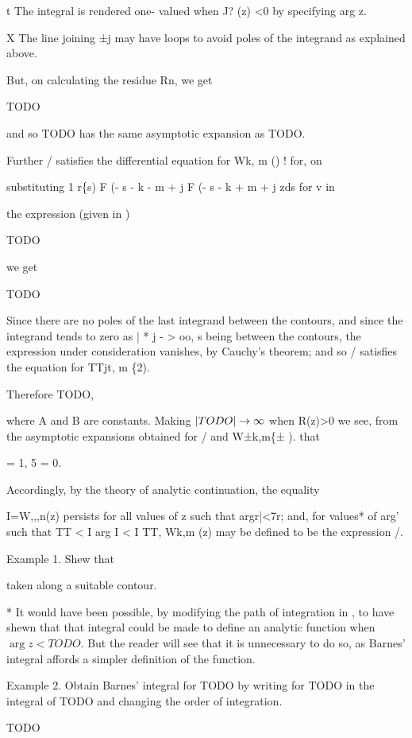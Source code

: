 t The integral is rendered one- valued when J? (z) <0 by specifying
arg z.

X The line joining ±j may have loops to avoid poles of the integrand
as explained above.

%
%
But, on calculating the residue Rn, we get

TODO

and so TODO has the same asymptotic expansion as TODO.

Further / satisfies the differential equation for Wk, m () ! for, on

substituting 1 r\{s) F (- s - k - m + j F (- s - k + m + j zds
for v in

the expression (given in )

TODO

we get

TODO

Since there are no poles of the last integrand between the contours,
and since the integrand tends to zero as | * j - > oo, s being
between the contours, the expression under consideration vanishes, by
Cauchy's theorem; and so / satisfies the equation for TTjt, m \{2).

Therefore TODO,

where A and B are constants. Making $\left| TODO \right| \rightarrow \infty$
when R(z)>0 we see, from the asymptotic expansions obtained for / and
W±k,m\{± ). that

 = 1, 5 = 0.

Accordingly, by the theory of analytic continuation, the equality

I=W,,,n(z) persists for all values of z such that argr|<7r; and, for
values* of arg' such that TT < I arg  I < I TT, Wk,m (z) may be
defined to be the expression /.

Example 1. Shew that

taken along a suitable contour.

* It would have been possible, by modifying the path of integration in , to have shewn that that integral could be made to define an
analytic function when $\arg z < TODO$. But the reader will see that
it is unnecessary to do so, as Barnes' integral affords a simpler
definition of the function.

%
%

Example 2. Obtain Barnes' integral for TODO by writing for TODO in the
integral of TODO and changing the order of integration.

TODO

